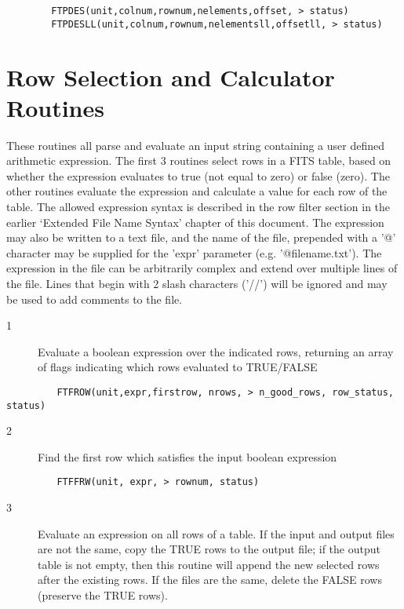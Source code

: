 \documentclass[11pt]{book}
\begin{document}
\begin{verbatim}
        FTPDES(unit,colnum,rownum,nelements,offset, > status)
        FTPDESLL(unit,colnum,rownum,nelementsll,offsetll, > status)
\end{verbatim}


\section{Row Selection and Calculator Routines \label{FTFROW}}

These routines all parse and evaluate an input string containing a user
defined arithmetic expression.  The first 3 routines select rows in a
FITS table, based on whether the expression evaluates to true (not
equal to zero) or false (zero).  The other routines evaluate the
expression and calculate a value for each row of the table.  The
allowed expression syntax is described in the row filter section in the
earlier `Extended File Name Syntax' chapter of this document.  The
expression may also be written to a text file, and the name of the
file, prepended with a '@' character may be supplied for the 'expr'
parameter (e.g.  '@filename.txt'). The  expression  in  the  file can
be arbitrarily complex and extend over multiple lines of the file.
Lines  that begin with 2 slash characters ('//') will  be ignored and
may be used to add comments to the file.


\begin{description}
\item[1 ] Evaluate a boolean expression over the indicated rows, returning an
 array of flags indicating which rows evaluated to TRUE/FALSE
\end{description}

\begin{verbatim}
         FTFROW(unit,expr,firstrow, nrows, > n_good_rows, row_status, status)
\end{verbatim}

\begin{description}
\item[2 ] Find the first row which satisfies the input boolean expression
\end{description}

\begin{verbatim}
         FTFFRW(unit, expr, > rownum, status)
\end{verbatim}

\begin{description}
\item[3 ]Evaluate an expression on all rows of a table.  If the input and output
files are not the same, copy the TRUE rows to the output file;  if the output
table is not empty, then this routine will append the new
selected rows after the existing rows.  If the
files are the same, delete the FALSE rows (preserve the TRUE rows).
\end{description}
\end{document}

